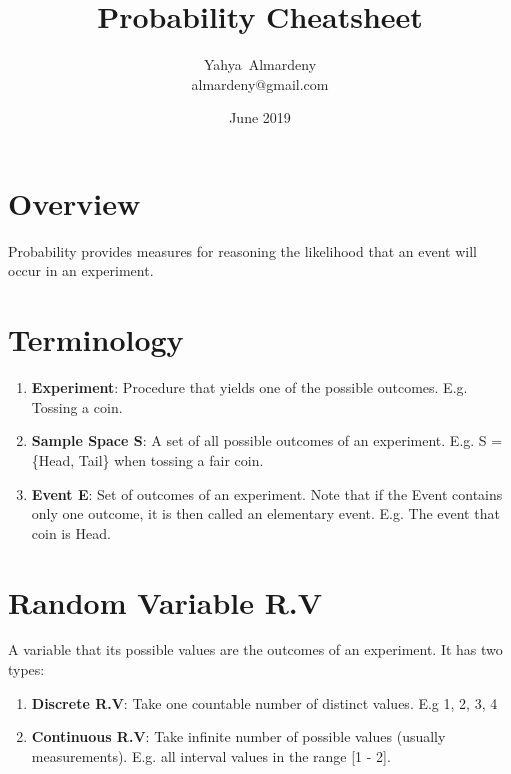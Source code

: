 \documentclass[11pt, twocolumn]{article}
\title{Probability Cheatsheet}
\author{Yahya~Almardeny\\almardeny@gmail.com}
\date{June 2019}
\begin{document}
\begin{titlepage}
\maketitle
\end{titlepage}

\section{Overview}
Probability provides measures for reasoning the likelihood that an event will occur in an experiment.
\section{Terminology}
\begin{enumerate}
\item \textbf{Experiment}: Procedure that yields one of the possible outcomes. E.g. Tossing a coin.
\item \textbf{Sample Space S}: A set of all possible outcomes of an experiment. E.g. S = \{Head, Tail\} when tossing a fair coin.
\item \textbf{Event E}: Set of outcomes of an experiment. Note that if the Event contains only one outcome, it is then called an elementary event. E.g. The event that coin is Head.
\end{enumerate}
\section{Random Variable R.V}
A variable that its possible values are the outcomes of an experiment. It has two types:
\begin{enumerate}
\item \textbf{Discrete R.V}: Take one countable number of distinct values. E.g 1, 2, 3, 4
\item \textbf{Continuous R.V}: Take infinite number of possible values (usually measurements). E.g. all interval values in the range [1 - 2].
\end{enumerate}
\end{document}
